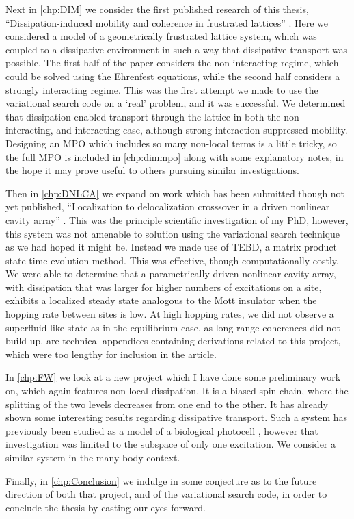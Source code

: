 Next in \cref{chp:DIM} we consider the first published research of this thesis, ``Dissipation-induced mobility and coherence in frustrated lattices'' \cite{Owen2017}. Here we considered a model of a geometrically frustrated lattice system, which was coupled to a dissipative environment in such a way that dissipative transport was possible. The first half of the paper considers the non-interacting regime, which could be solved using the Ehrenfest equations, while the second half considers a strongly interacting regime. This was the first attempt we made to use the variational search code on a `real' problem, and it was successful. We determined that dissipation enabled transport through the lattice in both the non-interacting, and interacting case, although strong interaction suppressed mobility. Designing an MPO which includes so many non-local terms is a little tricky, so the full MPO is included in \cref{chp:dimmpo} along with some explanatory notes, in the hope it may prove useful to others pursuing similar investigations.

Then in \cref{chp:DNLCA} we expand on work which has been submitted though not yet published, ``Localization to delocalization crosssover in a driven nonlinear cavity array'' \cite{Brown2018}. This was the principle scientific investigation of my PhD, however, this system was not amenable to solution using the variational search technique as we had hoped it might be. Instead we made use of TEBD, a matrix product state time evolution method. This was effective, though computationally costly. We were able to determine that a parametrically driven nonlinear cavity array, with dissipation that was larger for higher numbers of excitations on a site, exhibits a localized steady state analogous to the Mott insulator when the hopping rate between sites is low. At high hopping rates, we did not observe a superfluid-like state as in the equilibrium case, as long range coherences did not build up.  are technical appendices containing derivations related to this project, which were too lengthy for inclusion in the article.

In \cref{chp:FW} we look at a new project which I have done some preliminary work on, which again features non-local dissipation. It is a biased spin chain, where the splitting of the two levels decreases from one end to the other. It has already shown some interesting results regarding dissipative transport. Such a system has previously been studied as a model of a biological photocell \cite{Fruchtman2016}, however that investigation was limited to the subspace of only one excitation. We consider a similar system in the many-body context. 

Finally, in \cref{chp:Conclusion} we indulge in some conjecture as to the future direction of both that project, and of the variational search code, in order to conclude the thesis by casting our eyes forward. 